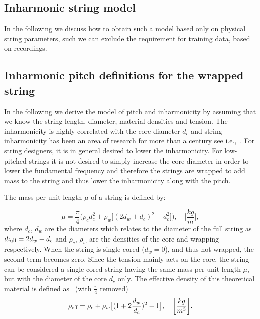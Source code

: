 \documentclass{article}
\begin{document}
\begin{sloppy}
\section{Inharmonic string model} \label{sec:string_model}
%
%
In the following we discuss how to obtain such a model based only on physical string parameters, such we can exclude the requirement for training data, based on recordings.

\subsection{Inharmonic pitch definitions for the wrapped string}

In the following we derive the model of pitch and inharmonicity by assuming that we know the string length, diameter, material densities and tension.
The inharmonicity is highly correlated with the core diameter $d_c$ and string inharmonicity has been an area of research for more than a century see i.e.,~\cite{rayleigh:sound}. For string designers, it is in general desired to lower the inharmonicity. For low-pitched strings it is not desired to simply increase the core diameter in order to lower the fundamental frequency and therefore the strings are wrapped to add mass to the string and thus lower the inharmonicity along with the pitch. 

\noindent The mass per unit length $\mu$ of a string is defined by:

\begin{equation}
    \mu = \frac{\pi}{4}\Big(\rho_cd_c^2 + \rho_w\big[(2d_w+d_c)^2-d_c^2\big]\Big), \quad \bigg[\frac{kg}{m}\bigg],
\end{equation}
where $d_c$, $d_w$ are the diameters which relates to the diameter of the full string as $d_{\textup{full}}=2d_w+d_c$ and $\rho_c$, $\rho_w$ are the densities of the core and wrapping respectively. When the string is single-cored ($d_w = 0$), and thus not wrapped, the second term becomes zero. Since the tension mainly acts on the core, the string can be considered a single cored string having the same mass per unit length $\mu$, but with the diameter of the core $d_c$ only. The effective density of this theoretical material is defined as~\cite{firth:string_design} (with $\frac{\pi}{4}$ removed)
\begin{equation}
    \rho_{\textup{eff}} = \rho_c + \rho_w \big[(1+2\frac{d_w}{d_c})^2-1\big], \quad \bigg[\frac{kg}{m^3}\bigg].
\end{equation}


\end{sloppy}
\end{document}
